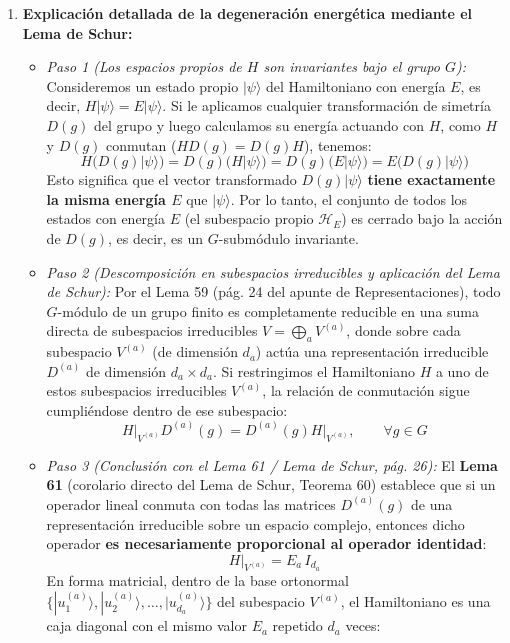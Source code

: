 \documentclass[11pt, a4paper]{article}
\begin{document}
\begin{enumerate}
    \item \textbf{Explicación detallada de la degeneración energética mediante el Lema de Schur:}
    \begin{itemize}
        \item \textit{Paso 1 (Los espacios propios de $H$ son invariantes bajo el grupo $G$):}
        Consideremos un estado propio $|\psi\rangle$ del Hamiltoniano con energía $E$, es decir, $H|\psi\rangle = E|\psi\rangle$. Si le aplicamos cualquier transformación de simetría $D(g)$ del grupo y luego calculamos su energía actuando con $H$, como $H$ y $D(g)$ conmutan ($H D(g) = D(g) H$), tenemos:
        \[
        H \big( D(g)|\psi\rangle \big) = D(g) \big( H|\psi\rangle \big) = D(g) \big( E|\psi\rangle \big) = E \big( D(g)|\psi\rangle \big)
        \]
        Esto significa que el vector transformado $D(g)|\psi\rangle$ \textbf{tiene exactamente la misma energía $E$} que $|\psi\rangle$. Por lo tanto, el conjunto de todos los estados con energía $E$ (el subespacio propio $\mathcal{H}_E$) es cerrado bajo la acción de $D(g)$, es decir, es un $G$-submódulo invariante.
        \item \textit{Paso 2 (Descomposición en subespacios irreducibles y aplicación del Lema de Schur):}
        Por el Lema 59 (pág. 24 del apunte de Representaciones), todo $G$-módulo de un grupo finito es completamente reducible en una suma directa de subespacios irreducibles $V = \bigoplus_a V^{(a)}$, donde sobre cada subespacio $V^{(a)}$ (de dimensión $d_a$) actúa una representación irreducible $D^{(a)}$ de dimensión $d_a \times d_a$.
        Si restringimos el Hamiltoniano $H$ a uno de estos subespacios irreducibles $V^{(a)}$, la relación de conmutación sigue cumpliéndose dentro de ese subespacio:
        \[
        \left. H \right|_{V^{(a)}} D^{(a)}(g) = D^{(a)}(g) \left. H \right|_{V^{(a)}}, \qquad \forall g \in G
        \]
        \item \textit{Paso 3 (Conclusión con el Lema 61 / Lema de Schur, pág. 26):}
        El \textbf{Lema 61} (corolario directo del Lema de Schur, Teorema 60) establece que si un operador lineal conmuta con todas las matrices $D^{(a)}(g)$ de una representación irreducible sobre un espacio complejo, entonces dicho operador \textbf{es necesariamente proporcional al operador identidad}:
        \[
        \left. H \right|_{V^{(a)}} = E_a \, I_{d_a}
        \]
        En forma matricial, dentro de la base ortonormal $\big\{ |u_1^{(a)}\rangle, |u_2^{(a)}\rangle, \dots, |u_{d_a}^{(a)}\rangle \big\}$ del subespacio $V^{(a)}$, el Hamiltoniano es una caja diagonal con el mismo valor $E_a$ repetido $d_a$ veces:

\end{itemize}
\end{enumerate}
\end{document}
